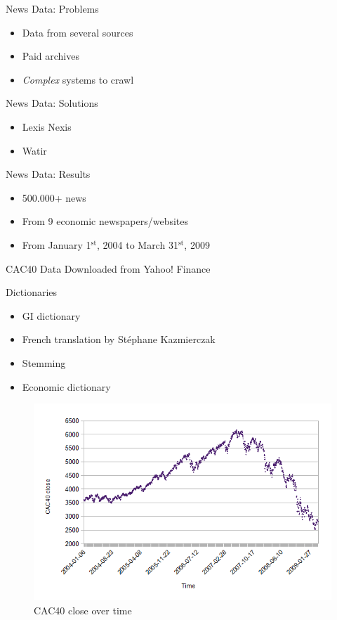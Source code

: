 \documentclass{beamer}
\newcommand{\superscript}[1]{\ensuremath{^{\textrm{#1}}}}
\newcommand{\st}[0]{\superscript{st}}
\begin{document}
\begin{frame}{News Data: Problems}
	\begin{itemize}
		\item Data from several sources
		\item Paid archives
		\item \emph{Complex} systems to crawl
	\end{itemize}
\end{frame}

\begin{frame}{News Data: Solutions}
	\begin{itemize}
		\item Lexis Nexis
		\item Watir
	\end{itemize}
\end{frame}

\begin{frame}{News Data: Results}
	\begin{itemize}
		\item 500.000+ news
		\item From 9 economic newspapers/websites
		\item From January 1\st, 2004 to March 31\st, 2009
	\end{itemize}
\end{frame}

\begin{frame}{CAC40 Data}
	Downloaded from Yahoo! Finance
\end{frame}

\begin{frame}{Dictionaries}
	\begin{itemize}
		\item GI dictionary
		\item French translation by Stéphane Kazmierczak
		\item Stemming
		\item Economic dictionary
	\end{itemize}
\end{frame}

\begin{frame}
	\begin{figure}
		\caption{CAC40 close over time}
		\includegraphics[scale=.5]{plots/time/cac.png}
	\end{figure}
\end{frame}
\end{document}
